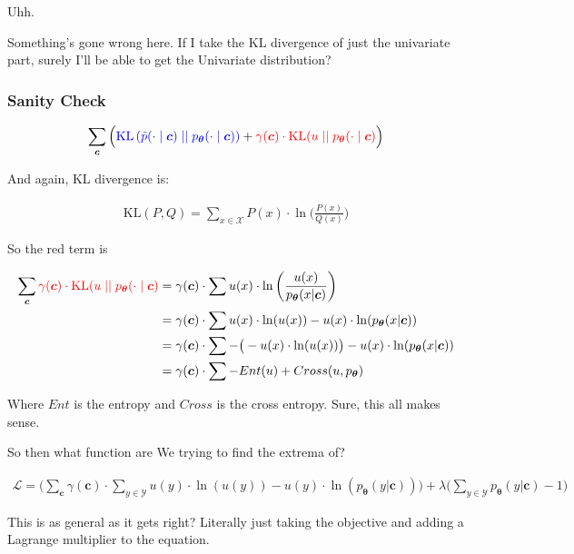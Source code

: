 \documentclass{article}
\newcommand{\KL}{\mathrm{KL}}
\newcommand{\uniform}{u}
\newcommand{\vtheta}{\boldsymbol{\theta}}
\newcommand{\model}{p_{\vtheta}}
\newcommand{\context}{\boldsymbol{c}}
\begin{document}
		Uhh.
		
		Something's gone wrong here. If I take the KL divergence of just the univariate part, surely I'll be able to get the Univariate distribution?
		
		\subsubsection{Sanity Check}
		
			\begin{align}
		  		 \sum_{\context} \Big( {\color{blue} \KL\left(\tilde{p}(\cdot 			\mid \context) \mid\mid \model(\cdot \mid \context)					\right)} + {\color{red}\gamma(\context) \cdot 						\KL(\uniform \mid\mid \model(\cdot \mid \context)}\Big)
			\end{align}
			
			And again, KL divergence is:
			
			\begin{align}
				\KL(P, Q) = \sum_{x\in\mathcal{X}} P(x)\cdot \ln\bigg(\frac{P(x)}{Q(x)}\bigg)
			\end{align}
		
			So the red term is
			
			\begin{align}
				\sum_{\context} {\color{red}\gamma(\context) \cdot 						\KL(\uniform \mid\mid \model(\cdot \mid \context)} &= \gamma(\context)\cdot\sum u(x)\cdot \ln\bigg(\frac{u(x)}{\model(x|\context)}\bigg)\\
			&= \gamma(\context)\cdot\sum u(x)\cdot\ln(u(x)) - u(x)\cdot\ln(\model(x|\context))\\
				&= \gamma(\context)\cdot\sum -\big(-u(x)\cdot\ln(u(x))\big) - u(x)\cdot\ln(\model(x|\context))\\
				&= \gamma(\context)\cdot\sum -Ent(u) + Cross(u, \model)
			\end{align}
			
			Where $Ent$ is the entropy and $Cross$ is the cross entropy. Sure, this all makes sense. 
			
			So then what function are We trying to find the extrema of? 
			
			\begin{align}
				\mathcal{L} = \bigg(\sum_{\context} \gamma(\context)\cdot\sum_{y\in\mathcal{Y}} u(y)\cdot\ln(u(y)) - u(y)\cdot\ln(\model(y|\context))\bigg) + \lambda\bigg(\sum_{y\in\mathcal{Y}} \model(y|\context) -1 \bigg)
			\end{align}
			
			This is as general as it gets right? Literally just taking the objective and adding a Lagrange multiplier to the equation. 
\end{document}
